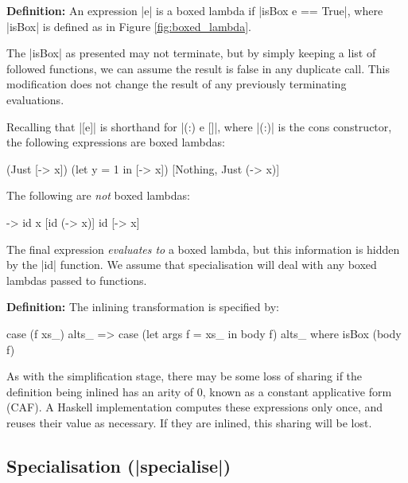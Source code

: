 \documentclass[preprint]{sigplanconf}
\newenvironment{definition}
    {\textbf{Definition:}}
    {\noexample}
\begin{document}
\begin{definition}
An expression |e| is a boxed lambda if |isBox e == True|, where |isBox| is defined as in Figure \ref{fig:boxed_lambda}.
\end{definition}

The |isBox| as presented may not terminate, but by simply keeping a list of followed functions, we can assume the result is false in any duplicate call. This modification does not change the result of any previously terminating evaluations.

\begin{example}
Recalling that |[e]| is shorthand for |(:) e []|, where |(:)| is the cons constructor, the following expressions are boxed lambdas:

\ignore\begin{code}
[\x -> x]
(Just [\x -> x])
(let y = 1 in [\x -> x])
[Nothing, Just (\x -> x)]
\end{code}

The following are \textit{not} boxed lambdas:

\ignore\begin{code}
\x -> id x
[id (\x -> x)]
id [\x -> x]
\end{code}

The final expression \textit{evaluates to} a boxed lambda, but this information is hidden by the |id| function. We assume that specialisation will deal with any boxed lambdas passed to functions.
\end{example}

\begin{definition}
The inlining transformation is specified by:

\ignore\begin{code}
case (f xs_) alts_
    => case (let args f = xs_ in body f) alts_
    where isBox (body f)
\end{code}
\end{definition}

As with the simplification stage, there may be some loss of sharing if the definition being inlined has an arity of 0, known as a constant applicative form (CAF). A Haskell implementation computes these expressions only once, and reuses their value as necessary. If they are inlined, this sharing will be lost.

\subsection{Specialisation (|specialise|)}
\end{document}
